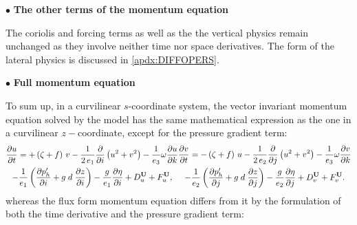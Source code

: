 \documentclass[../main/NEMO_manual]{subfiles}
\begin{document}
$\bullet$ \textbf{The other terms of the momentum equation}

The coriolis and forcing terms as well as the the vertical physics remain unchanged as
they involve neither time nor space derivatives.
The form of the lateral physics is discussed in \autoref{apdx:DIFFOPERS}.

$\bullet$ \textbf{Full momentum equation}

To sum up, in a curvilinear $s$-coordinate system,
the vector invariant momentum equation solved by the model has the same mathematical expression as
the one in a curvilinear $z-$coordinate, except for the pressure gradient term:
\begin{subequations}
  \label{eq:SCOORD_dyn_vect}
  \begin{multline}
    \label{eq:SCOORD_PE_dyn_vect_u}
    \frac{\partial u}{\partial t}=
    +   \left( {\zeta +f} \right)\,v
    -   \frac{1}{2\,e_1} \frac{\partial}{\partial i} \left(  u^2+v^2   \right)
    -   \frac{1}{e_3} \omega \frac{\partial u}{\partial k}       \\
    -   \frac{1}{e_1 } \left(    \frac{\partial p_h'}{\partial i} + g\; d  \; \frac{\partial z}{\partial i}    \right)
    -   \frac{g}{e_1 } \frac{\partial \eta}{\partial i}
    +   D_u^{\vect{U}}  +   F_u^{\vect{U}} ,
  \end{multline}
  \begin{multline}
    \label{eq:SCOORD_dyn_vect_v}
    \frac{\partial v}{\partial t}=
    -   \left( {\zeta +f} \right)\,u
    -   \frac{1}{2\,e_2 }\frac{\partial }{\partial j}\left(  u^2+v^2  \right)
    -   \frac{1}{e_3 } \omega \frac{\partial v}{\partial k}         \\
    -   \frac{1}{e_2 } \left(    \frac{\partial p_h'}{\partial j} + g\; d  \; \frac{\partial z}{\partial j}    \right)
    -   \frac{g}{e_2 } \frac{\partial \eta}{\partial j}
    +  D_v^{\vect{U}}  +   F_v^{\vect{U}} .
  \end{multline}
\end{subequations}
whereas the flux form momentum equation differs from it by
the formulation of both the time derivative and the pressure gradient term:
\end{document}
